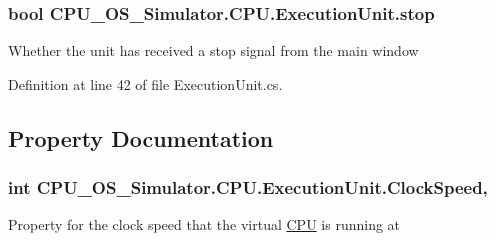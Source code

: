 \hypertarget{class_c_p_u___o_s___simulator_1_1_c_p_u_1_1_execution_unit_aad508435c1085ec880b75723260b0439}{}
\subsubsection[{stop}]{\setlength{\rightskip}{0pt plus 5cm}bool C\+P\+U\+\_\+\+O\+S\+\_\+\+Simulator.\+C\+P\+U.\+Execution\+Unit.\+stop\hspace{0.3cm}{\ttfamily [private]}}\label{class_c_p_u___o_s___simulator_1_1_c_p_u_1_1_execution_unit_aad508435c1085ec880b75723260b0439}


Whether the unit has received a stop signal from the main window 



Definition at line 42 of file Execution\+Unit.\+cs.



\subsection{Property Documentation}
\hypertarget{class_c_p_u___o_s___simulator_1_1_c_p_u_1_1_execution_unit_ac34a0c232ee8d1996d29f5d8614556ab}{}
\subsubsection[{Clock\+Speed}]{\setlength{\rightskip}{0pt plus 5cm}int C\+P\+U\+\_\+\+O\+S\+\_\+\+Simulator.\+C\+P\+U.\+Execution\+Unit.\+Clock\+Speed\hspace{0.3cm}{\ttfamily [get]}, {\ttfamily [set]}}\label{class_c_p_u___o_s___simulator_1_1_c_p_u_1_1_execution_unit_ac34a0c232ee8d1996d29f5d8614556ab}


Property for the clock speed that the virtual \hyperlink{namespace_c_p_u___o_s___simulator_1_1_c_p_u}{C\+P\+U} is running at 



